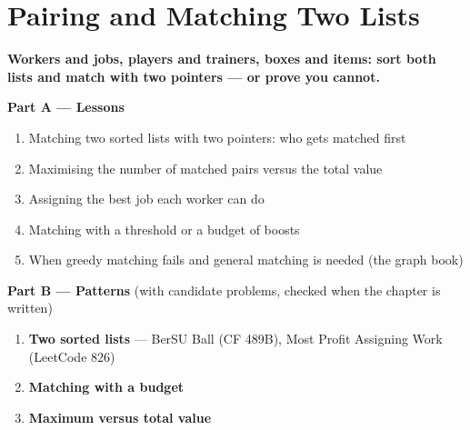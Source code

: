 \chapter{Pairing and Matching Two Lists}
\label{ch:matching}

\begin{tcolorbox}[enhanced, colback=white, colframe=secondaryblue, boxrule=1pt, arc=2mm]
\textbf{\large\textcolor{primaryblue}{Workers and jobs, players and trainers, boxes and items: sort both lists and match with two pointers --- or prove you cannot.}}
\end{tcolorbox}


\begin{plannedbox}
\textbf{Part A --- Lessons}
\begin{enumerate}[leftmargin=*, label=\textbf{A\arabic*.}, itemsep=1pt]
    \item Matching two sorted lists with two pointers: who gets matched first
    \item Maximising the number of matched pairs versus the total value
    \item Assigning the best job each worker can do
    \item Matching with a threshold or a budget of boosts
    \item When greedy matching fails and general matching is needed (the graph book)
\end{enumerate}
\textbf{Part B --- Patterns} (with candidate problems, checked when the chapter is written)
\begin{enumerate}[leftmargin=*, label=\textbf{P\arabic*.}, itemsep=1pt]
    \item \textbf{Two sorted lists} --- BerSU Ball {\small\color{darkgray}(CF 489B)}, Most Profit Assigning Work {\small\color{darkgray}(LeetCode 826)}
    \item \textbf{Matching with a budget}
    \item \textbf{Maximum versus total value}
\end{enumerate}
\end{plannedbox}

